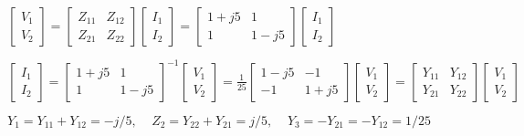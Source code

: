 \documentclass{article}
\def\lthtmlcheckvsize{\ifdim\ht\sizebox<\vsize 
  \ifdim\wd\sizebox<\hsize\expandafter\hfill\fi \expandafter\vfill
  \else\expandafter\vss\fi}%
\begin{document}
{\newpage\clearpage
{}%
$\displaystyle \left[ \begin{array}{l} V_1 \\V_2\end{array} \right]=
\left[ \begin{array}{cc} Z_{11} & Z_{12} \\Z_{21} & Z_{22} \end{array} \right]
\left[ \begin{array}{l} I_1 \\I_2\end{array} \right]
=	\left[ \begin{array}{cc} 1+j5 & 1 \\1 & 1-j5 \end{array} \right]
\left[ \begin{array}{l} I_1 \\I_2\end{array} \right]$%
\lthtmlindisplaymathZ
\lthtmlcheckvsize\clearpage}

{\newpage\clearpage
{}%
$\displaystyle \left[ \begin{array}{l} I_1 \\I_2\end{array} \right]=
\left[ \begin{array}{cc} 1+j5 & 1 \\1 & 1-j5 \end{array} \right]^{-1}
\left[ \begin{array}{l} V_1 \\V_2\end{array} \right]
=\frac{1}{25}
\left[ \begin{array}{cc} 1-j5 & -1 \\-1 & 1+j5 \end{array} \right]
\left[ \begin{array}{l} V_1 \\V_2\end{array} \right]
=	\left[ \begin{array}{cc} Y_{11} & Y_{12} \\Y_{21} & Y_{22} \end{array} \right]
\left[ \begin{array}{l} V_1 \\V_2\end{array} \right]$%
\lthtmlindisplaymathZ
\lthtmlcheckvsize\clearpage}

{\newpage\clearpage
{}%
$\displaystyle Y_1=Y_{11}+Y_{12}=-j/5,\;\;\;\;Z_2=Y_{22}+Y_{21}=j/5,\;\;\;\;
Y_3=-Y_{21}=-Y_{12}=1/25$%
\lthtmlindisplaymathZ
\lthtmlcheckvsize\clearpage}
\end{document}
